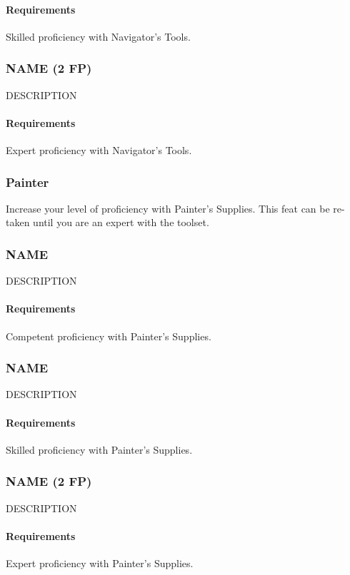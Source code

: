     \paragraph{Requirements} Skilled proficiency with Navigator's Tools.
\subsubsection{NAME (2 FP)} \label{feat::name}
    DESCRIPTION
    \paragraph{Requirements} Expert proficiency with Navigator's Tools.
\subsubsection{Painter} \label{feat::painter}
    Increase your level of proficiency with Painter's Supplies.
    This feat can be re-taken until you are an expert with the toolset.
\subsubsection{NAME} \label{feat::name}
    DESCRIPTION
    \paragraph{Requirements} Competent proficiency with Painter's Supplies.
\subsubsection{NAME} \label{feat::name}
    DESCRIPTION
    \paragraph{Requirements} Skilled proficiency with Painter's Supplies.
\subsubsection{NAME (2 FP)} \label{feat::name}
    DESCRIPTION
    \paragraph{Requirements} Expert proficiency with Painter's Supplies.
